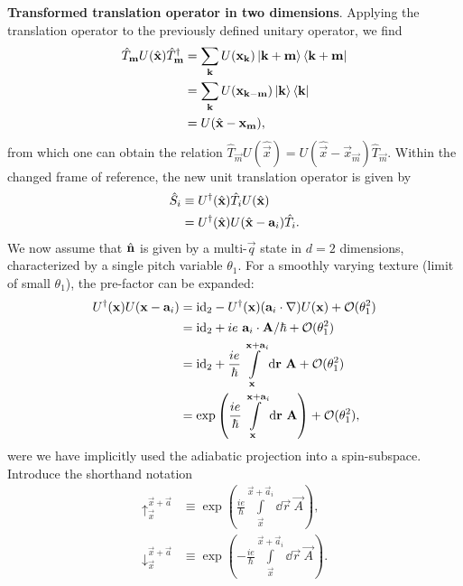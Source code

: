 \documentclass[
    aps,
    prb,
    twocolumn,
    floatfix,
    superscriptaddress,
	10pt
]{revtex4-2}
\begin{document}

{\bf Transformed translation operator in two dimensions}. 
Applying the translation operator to the previously defined unitary operator, we find
\begin{align}
	\hat{T}_\vec{m} U( \hat{\vec{x}}) \hat{T}_\vec{m}^\dagger
	& = \sum_{\vec{k}} U(\vec{x}_\vec{k}) \ket{\vec{k}+\vec{m}} \bra{\vec{k}+\vec{m}}
	\notag \\
	& = \sum_{\vec{k}} U( \vec{x}_{\vec{k}- \vec{m}} ) \ket{\vec{k}} \bra{\vec{k}}
	\notag \\
	& = U( \hat{\vec{x}} - \vec{x}_\vec{m}),
\end{align}
from which one can obtain the relation
$\hat{T}_\vec{m} U( \hat{\vec{x}}) = U( \hat{\vec{x}} - \vec{x}_\vec{m}) \hat{T}_\vec{m}$.
Within the changed frame of reference, the new unit translation operator is given by
\begin{align}
	\hat{S}_i &\equiv U^\dagger ( \hat{\vec{x}}) \hat{T}_i U ( \hat{\vec{x}})
	\notag \\ &=
	U^\dagger ( \hat{\vec{x}}) U( \hat{\vec{x}} - \vec{a}_i) \hat{T}_i  .
\end{align}
We now assume that $\hatn$ is given by a multi-$\vec{q}$ state in $d=2$ dimensions, characterized by a single pitch variable $\theta_1$.
For a smoothly varying texture (limit of small $\theta_1$), the pre-factor can be expanded:
\begin{align}
	U^\dagger ( \vec{x}) U( \vec{x} - \vec{a}_i) 
	& = \id_2
	- U^\dagger ( \vec{x})( \vec{a}_i \cdot \nabla) U( \vec{x} ) + \mathcal{O}(\theta_1^2)
	\notag \\
	& = \id_2
	+ i  e~\vec{a}_i  \cdot \vec{A} / \hbar + \mathcal{O}(\theta_1^2)
	\notag \\
	& = \id_2
	+ \frac{i e}{\hbar} \int\limits_{\vec{x}}^{\vec{x}+\vec{a}_i} \dd\vec{r}~\vec{A}  + \mathcal{O}(\theta_1^2) 
	\notag \\
	& = \exp\left( \frac{i e}{\hbar} \int\limits_{\vec{x}}^{\vec{x}+\vec{a}_i} \dd\vec{r}~\vec{A} \right) + \mathcal{O}(\theta_1^2) ,
\end{align}
were we have implicitly used the adiabatic projection into a spin-subspace.
Introduce the shorthand notation
\begin{align}
	\uparrow_{\vec{x}}^{\vec{x}+\vec{a} } &\equiv \exp\left( \frac{i e}{\hbar} \int\limits_{\vec{x}}^{\vec{x}+\vec{a}_i} \dd\vec{r}~\vec{A} \right) ,
	\\
	\downarrow_{\vec{x}}^{\vec{x}+\vec{a} } &\equiv \exp\left( -\frac{i e}{\hbar} \int\limits_{\vec{x}}^{\vec{x}+\vec{a}_i} \dd\vec{r}~\vec{A} \right) .
\end{align}
\end{document}
